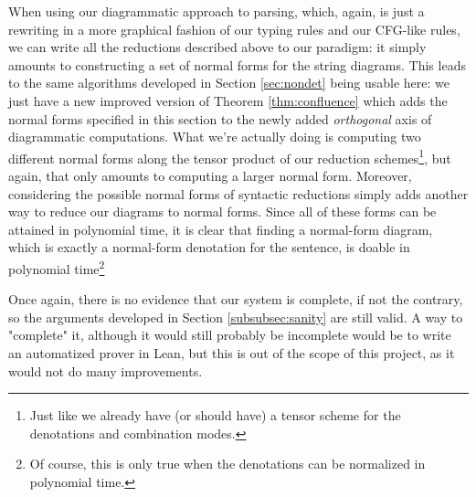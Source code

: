 \medskip

When using our diagrammatic approach to parsing, which, again, is just a
rewriting in a more graphical fashion of our typing rules and our CFG-like
rules, we can write all the reductions described above to our paradigm:
it simply amounts to constructing a set of normal forms for the string diagrams.
This leads to the same algorithms developed in Section \ref{sec:nondet} being
usable here: we just have a new improved version of Theorem
\ref{thm:confluence} which adds the normal forms specified in this section to
the newly added \emph{orthogonal} axis of diagrammatic computations.
What we're actually doing is computing two different normal forms along the
tensor product of our reduction schemes\footnote{Just like we already have (or
	should have) a tensor scheme for the denotations and combination modes.},
but again, that only amounts to computing a larger normal form.
Moreover, considering the possible normal forms of syntactic reductions simply
adds another way to reduce our diagrams to normal forms.
Since all of these forms can be attained in polynomial time, it is clear that
finding a normal-form diagram, which is exactly a normal-form denotation for
the sentence, is doable in polynomial time\footnote{Of course, this is only
	true when the denotations can be normalized in polynomial time.}

\medskip

Once again, there is no evidence that our system is complete, if not the
contrary, so the arguments developed in Section \ref{subsubsec:sanity} are
still valid.
A way to "complete" it, although it would still probably be incomplete would be
to write an automatized prover in Lean, but this is out of the scope of this
project, as it would not do many improvements.
